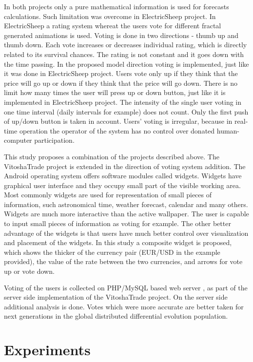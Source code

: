 \documentclass[runningheads]{llncs}
\begin{document}
In both projects only a pure mathematical information is used for forecasts calculations. Such limitation was overcome in ElectricSheep \cite{draves01} project. In ElectricSheep a rating system whereat the users vote for different fractal generated animations is used. Voting is done in two directions - thumb up and thumb down. Each vote increases or decreases individual rating, which is directly related to its survival chances. The rating is not constant and it goes down with the time passing. In the proposed model direction voting is implemented, just like it was done in ElectricSheep project. Users vote only up if they think that the price will go up or down if they think that the price will go down. There is no limit how many times the user will press up or down button, just like it is implemented in ElectricSheep project. The intensity of the single user voting in one time interval (daily intervals for example) does not count. Only the first push of up/down button is taken in account. Users' voting is irregular, because in real-time operation the operator of the system has no control over donated human-computer participation. 

This study proposes a combination of the projects described above. The VitoshaTrade \cite{balabanov01} project is extended in the direction of voting system addition. The Android operating system offers software modules called widgets. Widgets have graphical user interface and they occupy small part of the visible working area. Most commonly widgets are used for representation of small pieces of information, such astronomical time, weather forecast, calendar and many others. Widgets are much more interactive than the active wallpaper. The user is capable to input small pieces of information as voting for example. The other better advantage of the widgets is that users have much better control over visualization and placement of the widgets. In this study a composite widget is proposed, which shows the thicker of the currency pair (EUR/USD in the example provided), the value of the rate between the two currencies, and arrows for vote up or vote down. 

Voting of the users is collected on PHP/MySQL based web server \cite{tomov01}, as part of the server side implementation of the VitoshaTrade project. On the server side additional analysis is done. Votes which were more accurate are better taken for next generations in the global distributed differential evolution population. 

\section{Experiments} \label{Experiments}
\end{document}
